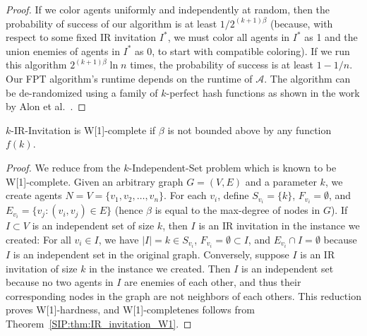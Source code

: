 \begin{proof}
	If we color agents uniformly and independently at random, then the probability of success of our algorithm is at least $1/2^{(k+1)\beta}$ (because, with respect to some fixed IR invitation $I^*$, we must color all agents in $I^*$ as 1 and the union enemies of agents in $I^*$ as 0, to start with compatible coloring). If we run this algorithm $2^{(k+1)\beta}\ln n$ times, the probability of success is at least $1 - 1/n$. Our FPT algorithm's runtime depends on the runtime of $\mathcal{A}$. The algorithm can be de-randomized using a family of $k$-perfect hash functions as shown in the work by Alon et al.~\cite{ColorCoding}.
\end{proof}


\begin{theorem} \label{SIP:thm:IR_invitation_large_beta}
	$k$-IR-Invitation is W[1]-complete if $\beta$ is not bounded above by any function $f(k)$. 
\end{theorem}
\begin{proof}
	We reduce from the $k$-Independent-Set problem which is known to be W[1]-complete. 
	Given an arbitrary graph $G = (V, E)$ and a parameter $k$, we create agents $N = V = \{v_1, v_2, \dots, v_n\}$. 
	For each $v_i$, define $S_{v_i} = \{k\}$, $F_{v_i} = \emptyset$, and $E_{v_i} = \{v_j : (v_i, v_j)\in E\}$ (hence $\beta$ is equal to the max-degree of nodes in $G$). 
	If $I \subset V$ is an independent set of size $k$, then $I$ is an IR invitation in the instance we created: For all $v_i \in I$, we have $|I| = k \in S_{v_i}$, $F_{v_i} = \emptyset \subset I$, and $E_{v_i} \cap I = \emptyset$ because $I$ is an independent set in the original graph.
	Conversely, suppose $I$ is an IR invitation of size $k$ in the instance we created. Then $I$ is an independent set because no two agents in $I$ are enemies of each other, and thus their corresponding nodes in the graph are not neighbors of each others. This reduction proves W[1]-hardness, and W[1]-completenes follows from Theorem~\ref{SIP:thm:IR_invitation_W1}.
\end{proof}

